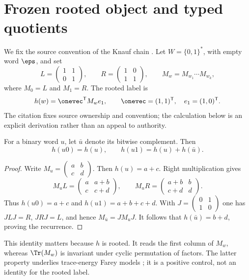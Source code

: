\section{Frozen rooted object and typed quotients}
\label{sec:source-types}

We fix the source convention of the Knauf chain
\citep{knauf1998spin,knauf1999erratum}.  Let $W=\{0,1\}^{*}$, with empty
word $\eps$, and set
\[
 L=\begin{pmatrix}1&1\\0&1\end{pmatrix},\qquad
 R=\begin{pmatrix}1&0\\1&1\end{pmatrix},\qquad
 M_w=M_{w_1}\cdots M_{w_k},
\]
where $M_0=L$ and $M_1=R$.  The rooted label is
\[
 h(w)=\onevec^{\mathsf T}M_we_1,
 \qquad \onevec=(1,1)^{\mathsf T},\quad e_1=(1,0)^{\mathsf T}.
\]
The citation fixes source ownership and convention; the calculation below is
an explicit derivation rather than an appeal to authority.

\begin{lemma}
For a binary word $u$, let $\bar u$ denote its bitwise complement.  Then
\[
 h(u0)=h(u),\qquad h(u1)=h(u)+h(\bar u).
\]
\end{lemma}
\begin{proof}
Write $M_u=\left(\begin{smallmatrix}a&b\\c&d\end{smallmatrix}\right)$.
Then $h(u)=a+c$.  Right multiplication gives
\[
 M_uL=\begin{pmatrix}a&a+b\\c&c+d\end{pmatrix},\qquad
 M_uR=\begin{pmatrix}a+b&b\\c+d&d\end{pmatrix}.
\]
Thus $h(u0)=a+c$ and $h(u1)=a+b+c+d$.  With
$J=\left(\begin{smallmatrix}0&1\\1&0\end{smallmatrix}\right)$ one has
$JLJ=R$, $JRJ=L$, and hence $M_{\bar u}=JM_uJ$.  It follows that
$h(\bar u)=b+d$, proving the recurrence.
\end{proof}

This identity matters because $h$ is rooted.  It reads the first column of
$M_w$, whereas $\Tr(M_w)$ is invariant under cyclic permutation of factors.
The latter property underlies trace-energy Farey models
\citep{prellbergFialaKleban2006cluster}; it is a positive control, not an
identity for the rooted label.

